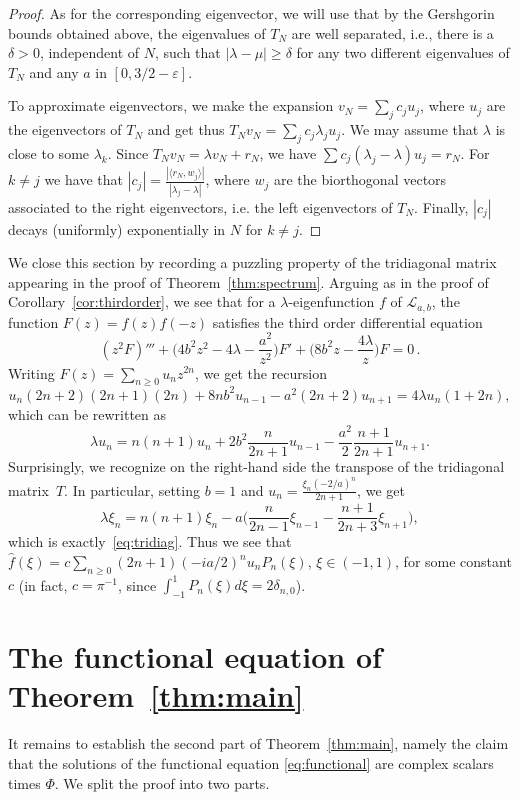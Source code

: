 \documentclass[12pt]{amsart}
\theoremstyle{plain}
\numberwithin{equation}{section}
\theoremstyle{definition}
\begin{document}
\begin{proof}
As for the corresponding eigenvector, we will use that by the Gershgorin 
bounds obtained above, the eigenvalues of $T_N$ are well separated, i.e.,  
there is a $\delta>0$, independent of $N$, such that $|\lambda-\mu|\ge \delta$ 
for any two different eigenvalues of $T_N$ and any $a$ in $[0,3/2-\varepsilon]$.

To approximate eigenvectors, we make the expansion $v_N = \sum_{j} c_j u_j$, where $u_j$ are the eigenvectors of $T_N$ and get thus $T_N v_N=\sum_j c_j  \lambda_j u_j$. We may assume that $\lambda$ is close to some $\lambda_k$. Since $T_N v_N = \lambda 
v_N + r_N$, we have $\sum c_j(\lambda_j -\lambda) u_j = r_N$. For $k\ne j$ we have
that $|c_j| = \frac{|\langle r_N, w_j\rangle|}{|\lambda_j-\lambda|}$, where 
$w_j$ are the biorthogonal vectors associated to the right eigenvectors, i.e. 
the left eigenvectors of $T_N$. Finally, $|c_j|$ decays (uniformly) exponentially in $N$ for 
$k\ne j$.
\end{proof}

We close this section by recording a puzzling property of the tridiagonal matrix appearing in the proof of Theorem~\ref{thm:spectrum}. Arguing as in the proof of Corollary~\ref{cor:thirdorder}, we see that for a $\lambda$-eigenfunction $f$ of $\mathcal{L}_{a,b}$, the function $F(z)=f(z)f(-z)$ satisfies the third order differential equation
	\[(z^2F)''' +
	\Big(4b^2z^2-4\lambda-\frac{a^2}{z^2}\Big)F' +
	\Big(8b^2z-\frac{4\lambda}{z}\Big)F= 0\,.\]
Writing $F(z)=\sum_{n\ge0}u_nz^{2n}$, we get the recursion
	\[u_{n}(2n+2)(2n+1)(2n)+8nb^2u_{n-1}-a^2(2n+2)u_{n+1}=4\lambda u_{n}(1+2n),\]
which can be rewritten as
	\[\lambda u_n = n(n+1)u_n+2b^2\frac{n}{2n+1}u_{n-1}-\frac{a^2}{2}\frac{n+1}{2n+1}u_{n+1}.\]
Surprisingly, we recognize on the right-hand side the transpose of the tridiagonal matrix~$T$. In particular, setting $b=1$ and $u_{n}=\frac{\xi_n(-2/a)^n}{2n+1}$, we get 
	\[\lambda \xi_{n} = n(n+1)\xi_{n}-a\big(\frac{n}{2n-1}\xi_{n-1}-\frac{n+1}{2n+3}\xi_{n+1}\big),\]
which is exactly~\eqref{eq:tridiag}. Thus we see that $\widehat{f}(\xi)=c\sum_{n\ge0}(2n+1)(-ia/2)^n u_nP_n(\xi)$, $\xi\in(-1,1)$, for some constant $c$ (in fact, $c=\pi^{-1}$, since $\int_{-1}^{1}P_n(\xi)d\xi=2\delta_{n,0}$).

\section{The functional equation of Theorem~\ref{thm:main}}\label{sec:functionaleq}
It remains to establish the second part of Theorem~\ref{thm:main}, namely the claim that the solutions of the functional equation \eqref{eq:functional} are complex scalars times  $\Phi$. We split the proof into two parts. 
\end{document}
